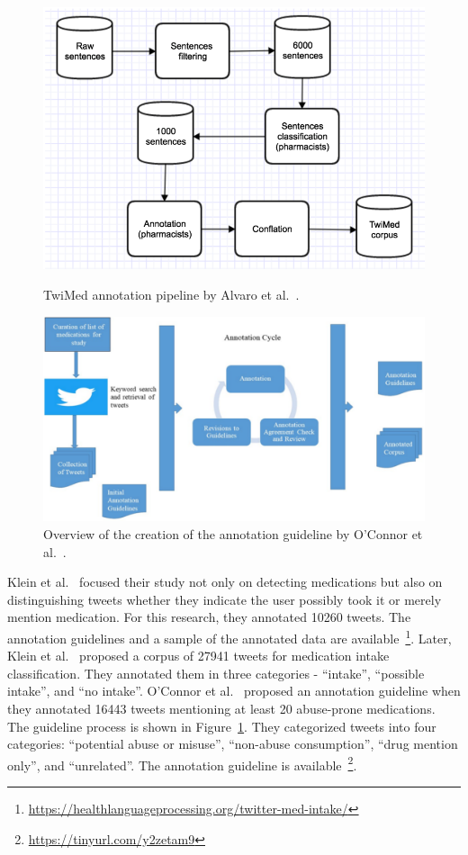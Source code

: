 \begin{figure}[h]
	\centering
	\begin{minipage}{0.45\textwidth}
		\includegraphics[width=0.99\linewidth]{Figures/b.png}
		\caption{TwiMed annotation pipeline by Alvaro et al.~\cite{alvaro2017twimed}.}
		\label{fig:architecture-twimed-alvaro}
	\end{minipage}
	\hfill
	\begin{minipage}{0.45\textwidth}
		\includegraphics[width=0.99\linewidth]{Figures/d.png}
		\caption{Overview of the creation of the annotation guideline by O’Connor et al.~\cite{o2020promoting}.}
		\label{fig:annotation-oconnor}
	\end{minipage}
\end{figure}


Klein et al.~\cite{klein2017detecting} focused their study not only on detecting medications but also on distinguishing tweets whether they indicate the user possibly took it or merely mention medication. For this research, they annotated 10260 tweets. The annotation guidelines and a sample of the annotated data are available~\footnote{\url{https://healthlanguageprocessing.org/twitter-med-intake/}}. Later, Klein et al.~\cite{klein2019analysis} proposed a corpus of 27941 tweets for medication intake classification. They annotated them in three categories - “intake”, “possible intake”, and “no intake”. O’Connor et al.~\cite{o2020promoting} proposed an annotation guideline when they annotated 16443 tweets mentioning at least 20 abuse-prone medications. The guideline process is shown in Figure~\ref{fig:annotation-oconnor}. They categorized tweets into four categories: “potential abuse or misuse”, “non-abuse consumption”, “drug mention only”, and “unrelated”. The annotation guideline is available~\footnote{\url{https://tinyurl.com/y2zetam9}}.